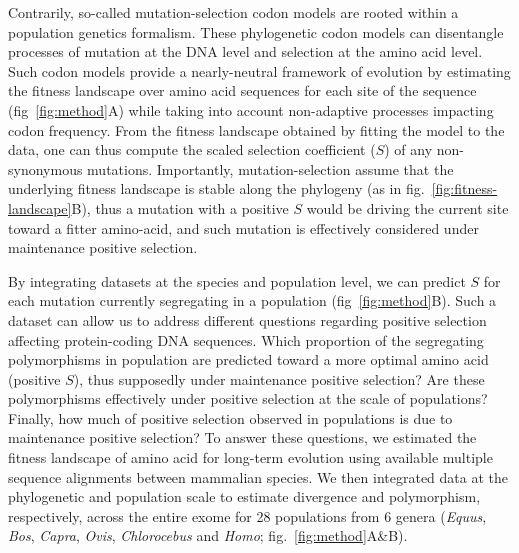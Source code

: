 \documentclass{article}
\newcommand{\Sphy}{S}
\begin{document}
    Contrarily, so-called mutation-selection codon models are rooted within a population genetics formalism\cite{halpern_evolutionary_1998, mccandlish_modeling_2014}.
    These phylogenetic codon models can disentangle processes of mutation at the DNA level and selection at the amino acid level.
    Such codon models provide a nearly-neutral framework of evolution by estimating the fitness landscape over amino acid sequences for each site of the sequence (fig~\ref{fig:method}A) while taking into account non-adaptive processes impacting codon frequency\cite{halpern_evolutionary_1998, rodrigue_mechanistic_2010, tamuri_estimating_2012}.
    From the fitness landscape obtained by fitting the model to the data, one can thus compute the scaled selection coefficient ($\Sphy$) of any non-synonymous mutations.
    Importantly, mutation-selection assume that the underlying fitness landscape is stable along the phylogeny (as in fig.~\ref{fig:fitness-landscape}B), thus a mutation with a positive $\Sphy$ would be driving the current site toward a fitter amino-acid, and such mutation is effectively considered under maintenance positive selection.

    By integrating datasets at the species and population level, we can predict $\Sphy$ for each mutation currently segregating in a population (fig~\ref{fig:method}B).
    Such a dataset can allow us to address different questions regarding positive selection affecting protein-coding DNA sequences.
    Which proportion of the segregating polymorphisms in population are predicted toward a more optimal amino acid (positive $\Sphy$), thus supposedly under maintenance positive selection?
    Are these polymorphisms effectively under positive selection at the scale of populations?
    Finally, how much of positive selection observed in populations is due to maintenance positive selection?
    To answer these questions, we estimated the fitness landscape of amino acid for long-term evolution using available multiple sequence alignments between mammalian species\cite{ranwez_orthomam_2007, howe_ensembl_2021}.
    We then integrated data at the phylogenetic and population scale to estimate divergence and polymorphism, respectively, across the entire exome for 28 populations from 6 genera (\textit{Equus},  \textit{Bos}, \textit{Capra}, \textit{Ovis}, \textit{Chlorocebus} and \textit{Homo}; fig.~\ref{fig:method}A\&B).
\end{document}

